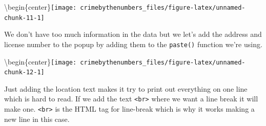\documentclass[
  12pt,
  openany]{book}
\newenvironment{Shaded}{\begin{snugshade}}{\end{snugshade}}
\newcommand{\AttributeTok}[1]{\textcolor[rgb]{0.61,0.61,0.61}{#1}}
\newcommand{\DecValTok}[1]{\textcolor[rgb]{0.06,0.06,0.06}{#1}}
\newcommand{\FunctionTok}[1]{\textcolor[rgb]{0,0,0}{#1}}
\newcommand{\NormalTok}[1]{#1}
\newcommand{\SpecialCharTok}[1]{\textcolor[rgb]{0,0,0}{#1}}
\newcommand{\StringTok}[1]{\textcolor[rgb]{0.5,0.5,0.5}{#1}}
\begin{document}
\textbackslash begin\{center\}\texttt{[image: crimebythenumbers\_files/figure-latex/unnamed-chunk-11-1]}

We don't have too much information in the data but we let's add the address and license number to the popup by adding them to the \texttt{paste()} function we're using.

\begin{Shaded}
\end{Shaded}

\textbackslash begin\{center\}\texttt{[image: crimebythenumbers\_files/figure-latex/unnamed-chunk-12-1]}

Just adding the location text makes it try to print out everything on one line which is hard to read. If we add the text \texttt{\textless{}br\textgreater{}} where we want a line break it will make one. \texttt{\textless{}br\textgreater{}} is the HTML tag for line-break which is why it works making a new line in this case.
\end{document}
